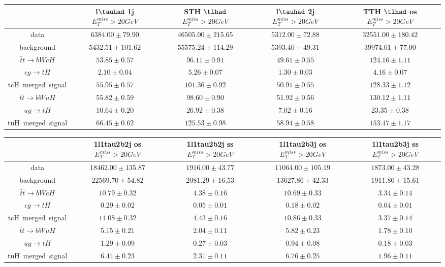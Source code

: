 \centering
\begin{tabular}{|c|c|c|c|c|} \hline
 & l$\tauhad$ 1j  $E_T^{miss}>20GeV$ & STH $\tlhad$   $E_T^{miss}>20GeV$ & l$\tauhad$ 2j  $E_T^{miss}>20GeV$ & TTH $\tlhad$ os  $E_T^{miss}>20GeV$\\\hline
data & $6384.00\pm79.90$ & $46505.00\pm215.65$ & $5312.00\pm72.88$ & $32551.00\pm180.42$\\\hline
background & $5432.51\pm101.62$ & $55575.24\pm114.29$ & $5393.40\pm49.31$ & $39974.01\pm77.00$\\\hline
$\bar{t}t\to bWcH$ & $53.85\pm0.57$ & $96.11\pm0.91$ & $49.61\pm0.55$ & $124.16\pm1.11$\\\hline
$cg\to tH$ & $2.10\pm0.04$ & $5.26\pm0.07$ & $1.30\pm0.03$ & $4.16\pm0.07$\\\hline
tcH~merged~signal & $55.95\pm0.57$ & $101.36\pm0.92$ & $50.91\pm0.55$ & $128.33\pm1.12$\\\hline
$\bar{t}t\to bWuH$ & $55.82\pm0.59$ & $98.60\pm0.90$ & $51.92\pm0.56$ & $130.12\pm1.11$\\\hline
$ug\to tH$ & $10.64\pm0.20$ & $26.92\pm0.38$ & $7.02\pm0.16$ & $23.35\pm0.38$\\\hline
tuH~merged~signal & $66.45\pm0.62$ & $125.53\pm0.98$ & $58.94\pm0.58$ & $153.47\pm1.17$\\\hline
\end{tabular}
\begin{tabular}{|c|c|c|c|c|} \hline
 & 1l1tau2b2j os  $E_T^{miss}>20GeV$ & 1l1tau2b2j ss  $E_T^{miss}>20GeV$ & 1l1tau2b3j os  $E_T^{miss}>20GeV$ & 1l1tau2b3j ss  $E_T^{miss}>20GeV$\\\hline
data & $18462.00\pm135.87$ & $1916.00\pm43.77$ & $11064.00\pm105.19$ & $1873.00\pm43.28$\\\hline
background & $22569.70\pm54.82$ & $2081.29\pm16.53$ & $13627.86\pm42.33$ & $1911.80\pm15.61$\\\hline
$\bar{t}t\to bWcH$ & $10.79\pm0.32$ & $4.38\pm0.16$ & $10.69\pm0.33$ & $3.34\pm0.14$\\\hline
$cg\to tH$ & $0.29\pm0.02$ & $0.05\pm0.01$ & $0.18\pm0.02$ & $0.04\pm0.01$\\\hline
tcH~merged~signal & $11.08\pm0.32$ & $4.43\pm0.16$ & $10.86\pm0.33$ & $3.37\pm0.14$\\\hline
$\bar{t}t\to bWuH$ & $5.15\pm0.21$ & $2.04\pm0.11$ & $5.82\pm0.23$ & $1.78\pm0.10$\\\hline
$ug\to tH$ & $1.29\pm0.09$ & $0.27\pm0.03$ & $0.94\pm0.08$ & $0.18\pm0.03$\\\hline
tuH~merged~signal & $6.44\pm0.23$ & $2.31\pm0.11$ & $6.76\pm0.25$ & $1.96\pm0.11$\\\hline
\end{tabular}
